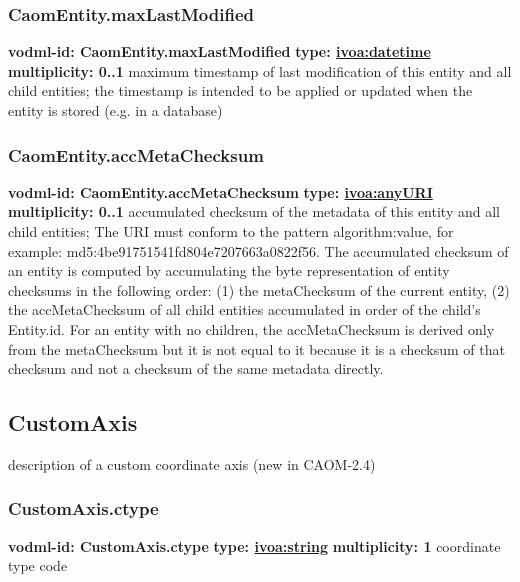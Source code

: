     \subsubsection{CaomEntity.maxLastModified}
      \textbf{vodml-id: CaomEntity.maxLastModified} \newline
      \textbf{type: \hyperref[sect:ivoa]{ivoa:datetime}} \newline
      \textbf{multiplicity: 0..1} \newline
      maximum timestamp of last modification of this entity and all child entities; the timestamp is intended to be applied or updated when the entity is stored (e.g. in a database)

    \subsubsection{CaomEntity.accMetaChecksum}
      \textbf{vodml-id: CaomEntity.accMetaChecksum} \newline
      \textbf{type: \hyperref[sect:ivoa]{ivoa:anyURI}} \newline
      \textbf{multiplicity: 0..1} \newline
      accumulated checksum of the metadata of this entity and all child entities; The URI must conform to the pattern {algorithm}:{value}, for example: md5:4be91751541fd804e7207663a0822f56. The accumulated checksum of an entity is computed by accumulating the byte representation of entity checksums in the following order: (1) the metaChecksum of the current entity, (2) the accMetaChecksum of all child entities accumulated in order of the child's Entity.id. For an entity with no children, the accMetaChecksum is derived only from the metaChecksum but it is not equal to it because it is a checksum of that checksum and not a checksum of the same metadata directly.

  \subsection{CustomAxis}
  \label{sect:CustomAxis}
    description of a custom coordinate axis (new in CAOM-2.4)

    \subsubsection{CustomAxis.ctype}
      \textbf{vodml-id: CustomAxis.ctype} \newline
      \textbf{type: \hyperref[sect:ivoa]{ivoa:string}} \newline
      \textbf{multiplicity: 1} \newline
      coordinate type code

